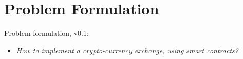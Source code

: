\section{Problem Formulation}
% 
Problem formulation, v0.1:

\begin{itemize}
    \item \textit{How to implement a crypto-currency exchange, using smart contracts?}
\end{itemize}